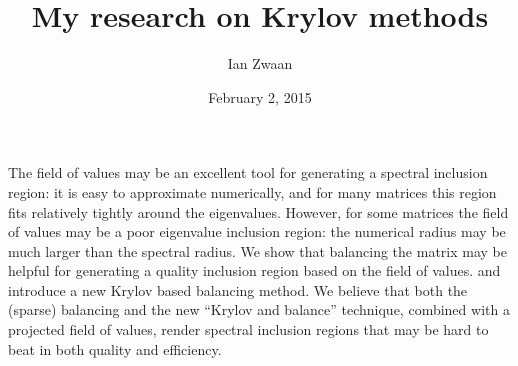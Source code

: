 \documentclass{article}
\title{My research on Krylov methods}
\author{Ian Zwaan}
\affil{PhD student at TU/e}
\date{February 2, 2015}
\begin{document}
\maketitle
\setcounter{page}{6}
The field of values may be an excellent tool for generating a spectral
inclusion region: it is easy to approximate numerically, and for many
matrices this region fits relatively tightly around the eigenvalues.
However, for some matrices the field of values may be a poor eigenvalue
inclusion region: the numerical radius may be much larger than the
spectral radius. We show that balancing the matrix may be helpful for
generating a quality inclusion region based on the field of values. and
introduce a new Krylov based balancing method. We believe that both the
(sparse) balancing and the new ``Krylov and balance'' technique,
combined with a projected field of values, render spectral inclusion
regions that may be hard to beat in both quality and efficiency.
\end{document}
